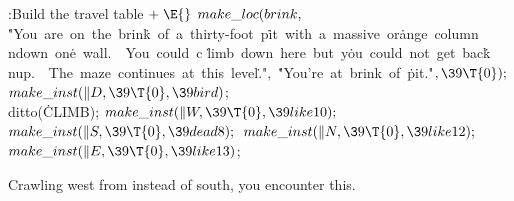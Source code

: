 \B{}:Build the travel table\X${}\mathrel+\E{}$\6
$\\{make\_loc}(\\{brink},{}$\6
\.{"You\ are\ on\ the\ brin}\)\.{k\ of\ a\ thirty-foot\ p}\)\.{it\ with\ a\
massive\ or}\)\.{ange\ column\\ndown\ on}\)\.{e\ wall.\ \ You\ could\ c}\)%
\.{limb\ down\ here\ but\ y}\)\.{ou\ could\ not\ get\ bac}\)\.{k\\nup.\ \ The\
maze\ con}\)\.{tinues\ at\ this\ level}\)\.{."}${},{}$\6
\.{"You're\ at\ brink\ of\ }\)\.{pit."}${},\39\T{0});{}$\6
${}\\{make\_inst}(\|D,\39\T{0},\39\\{bird}){}$;\5
\\{ditto}(\.{CLIMB});\6
${}\\{make\_inst}(\|W,\39\T{0},\39\\{like10});{}$\6
${}\\{make\_inst}(\|S,\39\T{0},\39\\{dead8});{}$\6
${}\\{make\_inst}(\|N,\39\T{0},\39\\{like12});{}$\6
${}\\{make\_inst}(\|E,\39\T{0},\39\\{like13}){}$;\par
\fi

Crawling west from  instead of south, you encounter this.

